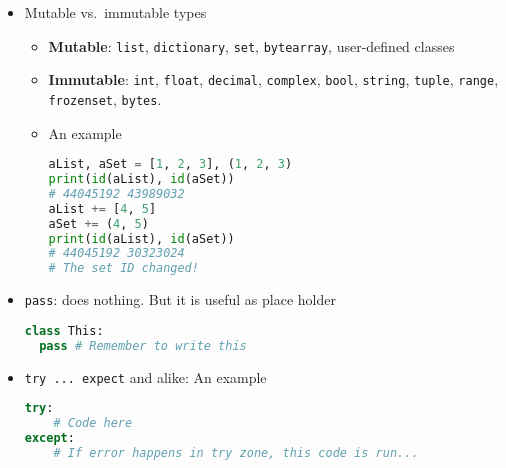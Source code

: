 \documentclass[a4paper,12pt,%
              final%
              ]{article}
\begin{document}
\begin{itemize}
\begin{itemize}
        \begin{itemize}
          \item \verb|v1='Bob'; v2='Alice'; greet="Hi, {v1}! It's {v2}"|
          \item Braces need to be escaped: e.g.~\verb|fr'{3}'| gives \verb|3|,  \verb|fr'{{3}}'| gives \verb|{3}|. Moreover, with variables:
\begin{verbatim}
test = 'TEST'
print(f'This is a {test}')
# This is a TEST
print(f'This is a {{test}}')
# This is a {test}
print(f'This is a {{{test}}}') # 2 for escaping, 1 for variable
# This is a {TEST}
\end{verbatim}
        \end{itemize}
      \item Raw-strings: identified by \texttt{r}, the backslash is interpreted as backslash (automatically escaped). For instance, \verb|'\n'| leads to a newline, \verb|r'\n'| leads to \verb|\n|.
      \item Combine \texttt{f}- and \texttt{r}-strings: just use \verb|fr'...'|
    \end{itemize}
  \item Mutable vs.~immutable types
    \begin{itemize}
      \item \textbf{Mutable}: \texttt{list}, \texttt{dictionary}, \texttt{set}, \texttt{bytearray}, user-defined classes
      \item \textbf{Immutable}: \texttt{int}, \texttt{float}, \texttt{decimal}, \texttt{complex}, \texttt{bool}, \texttt{string}, \texttt{tuple}, \texttt{range}, \texttt{frozenset}, \texttt{bytes}.
      \item An example
\begin{lstlisting}[language=python]
aList, aSet = [1, 2, 3], (1, 2, 3)
print(id(aList), id(aSet))
# 44045192 43989032
aList += [4, 5]
aSet += (4, 5)
print(id(aList), id(aSet))
# 44045192 30323024
# The set ID changed!
\end{lstlisting}
    \end{itemize}
  \item \verb|pass|: does nothing. But it is useful as place holder
\begin{lstlisting}[language=python]
class This:
  pass # Remember to write this
\end{lstlisting}
  \item \verb|try ... expect| and alike: An example
\begin{lstlisting}[language=python]
try:
    # Code here
except:
    # If error happens in try zone, this code is run...

\end{lstlisting}
\end{itemize}
\end{document}

